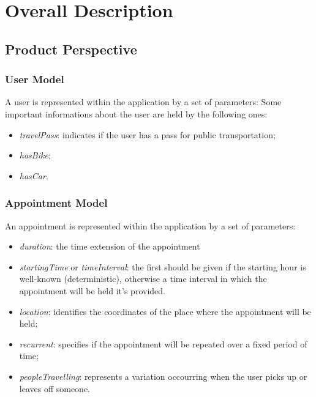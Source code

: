 \chapter{Overall Description}

\section{Product Perspective}

\subsection{User Model}
A user is represented within the application by a set of parameters:
Some important informations about the user are held by the following ones:
\begin{itemize}
\item \textit{travelPass}: indicates if the user has a pass for public transportation;
\item \textit{hasBike};
\item \textit{hasCar}.
\end{itemize}

\subsection{Appointment Model} \label{subsect:appointmentmodel}
An appointment is represented within the application by a set of parameters:
\begin{itemize}
\item \textit{duration}: the time extension of the appointment
\item \textit{startingTime} or \textit{timeInterval}: the first should be given if the starting hour is well-known (deterministic), otherwise a time interval in which the appointment will be held it's provided. 
\item \textit{location}: identifies the coordinates of the place where the appointment will be held;
\item \textit{recurrent}: specifies if the appointment will be repeated over a fixed period of time;
\item \textit{peopleTravelling}: represents a variation occourring when the user picks up or leaves off someone.
\end{itemize}

